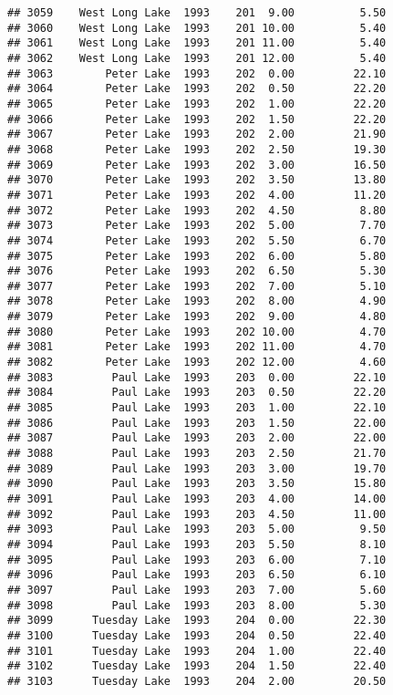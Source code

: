 \documentclass[
]{article}
\begin{document}
\begin{verbatim}
## 3059    West Long Lake  1993    201  9.00          5.50
## 3060    West Long Lake  1993    201 10.00          5.40
## 3061    West Long Lake  1993    201 11.00          5.40
## 3062    West Long Lake  1993    201 12.00          5.40
## 3063        Peter Lake  1993    202  0.00         22.10
## 3064        Peter Lake  1993    202  0.50         22.20
## 3065        Peter Lake  1993    202  1.00         22.20
## 3066        Peter Lake  1993    202  1.50         22.20
## 3067        Peter Lake  1993    202  2.00         21.90
## 3068        Peter Lake  1993    202  2.50         19.30
## 3069        Peter Lake  1993    202  3.00         16.50
## 3070        Peter Lake  1993    202  3.50         13.80
## 3071        Peter Lake  1993    202  4.00         11.20
## 3072        Peter Lake  1993    202  4.50          8.80
## 3073        Peter Lake  1993    202  5.00          7.70
## 3074        Peter Lake  1993    202  5.50          6.70
## 3075        Peter Lake  1993    202  6.00          5.80
## 3076        Peter Lake  1993    202  6.50          5.30
## 3077        Peter Lake  1993    202  7.00          5.10
## 3078        Peter Lake  1993    202  8.00          4.90
## 3079        Peter Lake  1993    202  9.00          4.80
## 3080        Peter Lake  1993    202 10.00          4.70
## 3081        Peter Lake  1993    202 11.00          4.70
## 3082        Peter Lake  1993    202 12.00          4.60
## 3083         Paul Lake  1993    203  0.00         22.10
## 3084         Paul Lake  1993    203  0.50         22.20
## 3085         Paul Lake  1993    203  1.00         22.10
## 3086         Paul Lake  1993    203  1.50         22.00
## 3087         Paul Lake  1993    203  2.00         22.00
## 3088         Paul Lake  1993    203  2.50         21.70
## 3089         Paul Lake  1993    203  3.00         19.70
## 3090         Paul Lake  1993    203  3.50         15.80
## 3091         Paul Lake  1993    203  4.00         14.00
## 3092         Paul Lake  1993    203  4.50         11.00
## 3093         Paul Lake  1993    203  5.00          9.50
## 3094         Paul Lake  1993    203  5.50          8.10
## 3095         Paul Lake  1993    203  6.00          7.10
## 3096         Paul Lake  1993    203  6.50          6.10
## 3097         Paul Lake  1993    203  7.00          5.60
## 3098         Paul Lake  1993    203  8.00          5.30
## 3099      Tuesday Lake  1993    204  0.00         22.30
## 3100      Tuesday Lake  1993    204  0.50         22.40
## 3101      Tuesday Lake  1993    204  1.00         22.40
## 3102      Tuesday Lake  1993    204  1.50         22.40
## 3103      Tuesday Lake  1993    204  2.00         20.50

\end{verbatim}
\end{document}
